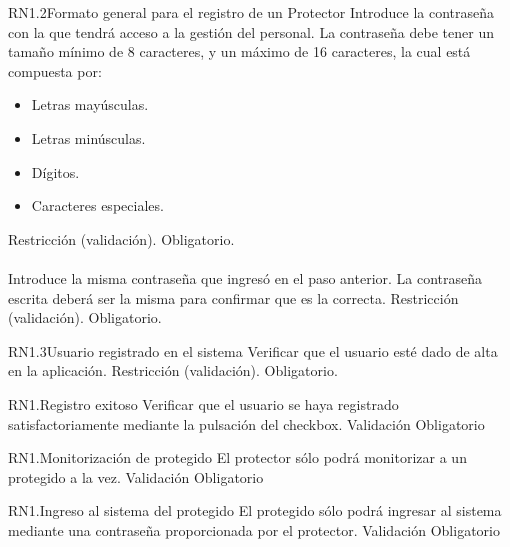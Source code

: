 \begin{BussinesRule}{RN1.2}{Formato general para el registro de un Protector}
	\BRitem[Contraseña:] Introduce la contraseña con la que tendrá acceso a la gestión del personal.
	\BRitem[Descripción:] La contraseña debe tener un tamaño mínimo de 8 caracteres, y un máximo de 16 caracteres, la cual está compuesta por:
		\begin{itemize}
			\item Letras mayúsculas.
			\item Letras minúsculas.
			\item Dígitos.
			\item Caracteres especiales.
		\end{itemize}
	\BRitem[Tipo:] Restricción (validación).
	\BRitem[Nivel:] Obligatorio.\\\\

	 Introduce la misma contraseña que ingresó en el paso anterior.
	\BRitem[Descripción:] La contraseña escrita deberá ser la misma para confirmar que es la correcta.
	\BRitem[Tipo:] Restricción (validación).
	\BRitem[Nivel:] Obligatorio.
\end{BussinesRule}


\begin{BussinesRule}{RN1.3}{Usuario registrado en el sistema}
	\BRitem[Descripción:] Verificar que el usuario esté dado de alta en la aplicación.
	\BRitem[Tipo:] Restricción (validación).
	\BRitem[Nivel:] Obligatorio.
\end{BussinesRule}




\begin{BussinesRule}{RN1.}{Registro exitoso}
	\BRitem[Descripción:] Verificar que el usuario se haya registrado satisfactoriamente mediante la pulsación del checkbox.
	\BRitem[Tipo:] Validación
	\BRitem[Nivel:] Obligatorio
\end{BussinesRule}


\begin{BussinesRule}{RN1.}{Monitorización de protegido}
	\BRitem[Descripción:] El protector sólo podrá monitorizar a un protegido a la vez.
	\BRitem[Tipo:] Validación
	\BRitem[Nivel:] Obligatorio
\end{BussinesRule}


\begin{BussinesRule}{RN1.}{Ingreso al sistema del protegido}
	\BRitem[Descripción:] El protegido sólo podrá ingresar al sistema mediante una contraseña proporcionada por el protector.
	\BRitem[Tipo:] Validación
	\BRitem[Nivel:] Obligatorio
\end{BussinesRule}





